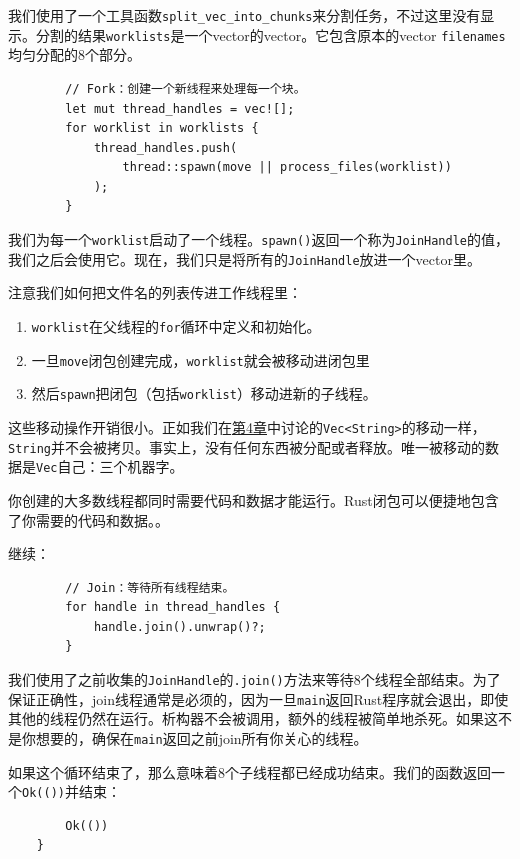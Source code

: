 我们使用了一个工具函数\texttt{split\_vec\_into\_chunks}来分割任务，不过这里没有显示。分割的结果\texttt{worklists}是一个vector的vector。它包含原本的vector \texttt{filenames}均匀分配的8个部分。

\begin{verbatim}
        // Fork：创建一个新线程来处理每一个块。
        let mut thread_handles = vec![];
        for worklist in worklists {
            thread_handles.push(
                thread::spawn(move || process_files(worklist))
            );
        }
\end{verbatim}

我们为每一个\texttt{worklist}启动了一个线程。\texttt{spawn()}返回一个称为\texttt{JoinHandle}的值，我们之后会使用它。现在，我们只是将所有的\texttt{JoinHandle}放进一个vector里。

注意我们如何把文件名的列表传进工作线程里：
\begin{enumerate}
    \item \texttt{worklist}在父线程的\texttt{for}循环中定义和初始化。
    \item 一旦\texttt{move}闭包创建完成，\texttt{worklist}就会被移动进闭包里
    \item 然后\texttt{spawn}把闭包（包括\texttt{worklist}）移动进新的子线程。
\end{enumerate}

这些移动操作开销很小。正如我们在\hyperref[ch04]{第4章}中讨论的\texttt{Vec<String>}的移动一样，\texttt{String}并不会被拷贝。事实上，没有任何东西被分配或者释放。唯一被移动的数据是\texttt{Vec}自己：三个机器字。

你创建的大多数线程都同时需要代码和数据才能运行。Rust闭包可以便捷地包含了你需要的代码和数据。。

继续：
\begin{verbatim}
        // Join：等待所有线程结束。
        for handle in thread_handles {
            handle.join().unwrap()?;
        }
\end{verbatim}

我们使用了之前收集的\texttt{JoinHandle}的\texttt{.join()}方法来等待8个线程全部结束。为了保证正确性，join线程通常是必须的，因为一旦\texttt{main}返回Rust程序就会退出，即使其他的线程仍然在运行。析构器不会被调用，额外的线程被简单地杀死。如果这不是你想要的，确保在\texttt{main}返回之前join所有你关心的线程。

如果这个循环结束了，那么意味着8个子线程都已经成功结束。我们的函数返回一个\texttt{Ok(())}并结束：
\begin{verbatim}
        Ok(())
    }
\end{verbatim}

